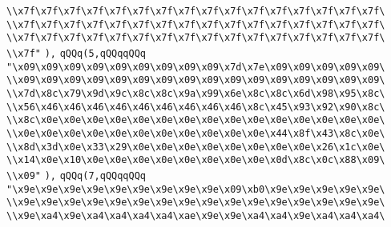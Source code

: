 \verb|\\x7f\x7f\x7f\x7f\x7f\x7f\x7f\x7f\x7f\x7f\x7f\x7f\x7f\x7f\x7f\x7f\|\newline
\verb|\\x7f\x7f\x7f\x7f\x7f\x7f\x7f\x7f\x7f\x7f\x7f\x7f\x7f\x7f\x7f\x7f\|\newline
\verb|\\x7f\x7f\x7f\x7f\x7f\x7f\x7f\x7f\x7f\x7f\x7f\x7f\x7f\x7f\x7f\x7f\|\newline
\verb|\\x7f"|\newline
\verb|),|\newline
\verb|qQQq(5,qQQqqQQq|\newline
\verb|"\x09\x09\x09\x09\x09\x09\x09\x09\x09\x7d\x7e\x09\x09\x09\x09\x09\|\newline
\verb|\\x09\x09\x09\x09\x09\x09\x09\x09\x09\x09\x09\x09\x09\x09\x09\x09\|\newline
\verb|\\x7d\x8c\x79\x9d\x9c\x8c\x8c\x9a\x99\x6e\x8c\x8c\x6d\x98\x95\x8c\|\newline
\verb|\\x56\x46\x46\x46\x46\x46\x46\x46\x46\x46\x8c\x45\x93\x92\x90\x8c\|\newline
\verb|\\x8c\x0e\x0e\x0e\x0e\x0e\x0e\x0e\x0e\x0e\x0e\x0e\x0e\x0e\x0e\x0e\|\newline
\verb|\\x0e\x0e\x0e\x0e\x0e\x0e\x0e\x0e\x0e\x0e\x0e\x44\x8f\x43\x8c\x0e\|\newline
\verb|\\x8d\x3d\x0e\x33\x29\x0e\x0e\x0e\x0e\x0e\x0e\x0e\x0e\x26\x1c\x0e\|\newline
\verb|\\x14\x0e\x10\x0e\x0e\x0e\x0e\x0e\x0e\x0e\x0e\x0d\x8c\x0c\x88\x09\|\newline
\verb|\\x09"|\newline
\verb|),|\newline
\verb|qQQq(7,qQQqqQQq|\newline
\verb|"\x9e\x9e\x9e\x9e\x9e\x9e\x9e\x9e\x9e\x09\xb0\x9e\x9e\x9e\x9e\x9e\|\newline
\verb|\\x9e\x9e\x9e\x9e\x9e\x9e\x9e\x9e\x9e\x9e\x9e\x9e\x9e\x9e\x9e\x9e\|\newline
\verb|\\x9e\xa4\x9e\xa4\xa4\xa4\xa4\xae\x9e\x9e\xa4\xa4\x9e\xa4\xa4\xa4\|\newline
